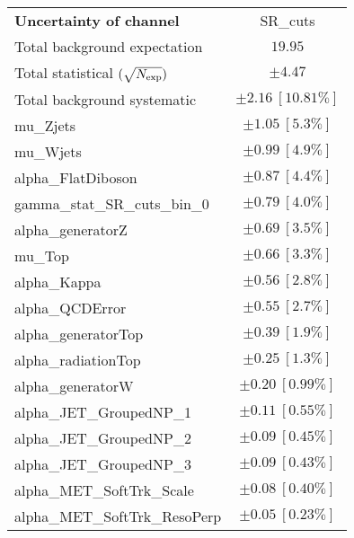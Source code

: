 
\begin{table}
\begin{center}
\setlength{\tabcolsep}{0.0pc}
\begin{tabular*}{\textwidth}{@{\extracolsep{\fill}}lc}
\noalign{\smallskip}\hline\noalign{\smallskip}
{\bf Uncertainty of channel}                                    & SR\_cuts            \\
\noalign{\smallskip}\hline\noalign{\smallskip}
Total background expectation             &  $19.95$       \\
\noalign{\smallskip}\hline\noalign{\smallskip}
Total statistical $(\sqrt{N_{\rm exp}})$              & $\pm 4.47$       \\
Total background systematic               & $\pm 2.16\ [10.81\%] $             \\
\noalign{\smallskip}\hline\noalign{\smallskip}
\noalign{\smallskip}\hline\noalign{\smallskip}
mu\_Zjets         & $\pm 1.05\ [5.3\%] $       \\
mu\_Wjets         & $\pm 0.99\ [4.9\%] $       \\
alpha\_FlatDiboson         & $\pm 0.87\ [4.4\%] $       \\
gamma\_stat\_SR\_cuts\_bin\_0         & $\pm 0.79\ [4.0\%] $       \\
alpha\_generatorZ         & $\pm 0.69\ [3.5\%] $       \\
mu\_Top         & $\pm 0.66\ [3.3\%] $       \\
alpha\_Kappa         & $\pm 0.56\ [2.8\%] $       \\
alpha\_QCDError         & $\pm 0.55\ [2.7\%] $       \\
alpha\_generatorTop         & $\pm 0.39\ [1.9\%] $       \\
alpha\_radiationTop         & $\pm 0.25\ [1.3\%] $       \\
alpha\_generatorW         & $\pm 0.20\ [0.99\%] $       \\
alpha\_JET\_GroupedNP\_1         & $\pm 0.11\ [0.55\%] $       \\
alpha\_JET\_GroupedNP\_2         & $\pm 0.09\ [0.45\%] $       \\
alpha\_JET\_GroupedNP\_3         & $\pm 0.09\ [0.43\%] $       \\
alpha\_MET\_SoftTrk\_Scale         & $\pm 0.08\ [0.40\%] $       \\
alpha\_MET\_SoftTrk\_ResoPerp         & $\pm 0.05\ [0.23\%] $       \\

\end{tabular*}
\end{center}
\end{table}
